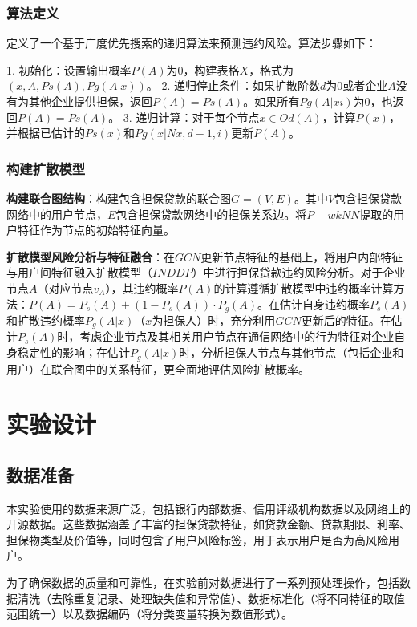 \documentclass{article}
\begin{document}
\subsubsection{算法定义}

定义了一个基于广度优先搜索的递归算法来预测违约风险。算法步骤如下：

1. 初始化：设置输出概率$P(A)$为$0$，构建表格$X$，格式为$(x,A,Ps(A),Pg(A|x))$。
2. 递归停止条件：如果扩散阶数$d$为$0$或者企业$A$没有为其他企业提供担保，返回$P(A)=Ps(A)$。如果所有$Pg(A|xi)$为$0$，也返回$P(A)=Ps(A)$。
3. 递归计算：对于每个节点$x\in Od(A)$，计算$P(x)$，并根据已估计的$Ps(x)$和$Pg(x|Nx,d - 1,i)$更新$P(A)$。
\subsubsection{构建扩散模型\cite{tang2009social}}


\textbf{构建联合图结构}：构建包含担保贷款的联合图$G=(V,E)$。其中$V$包含担保贷款网络中的用户节点，$E$包含担保贷款网络中的担保关系边。将$P - wkNN$提取的用户特征作为节点的初始特征向量。

\textbf{扩散模型风险分析与特征融合}：在$GCN$更新节点特征的基础上，将用户内部特征与用户间特征融入扩散模型（$INDDP$）中进行担保贷款违约风险分析。对于企业节点$A$（对应节点$v_{A}$），其违约概率$P(A)$的计算遵循扩散模型中违约概率计算方法：$P(A)=P_{s}(A)+(1 - P_{s}(A))\cdot P_{g}(A)$。在估计自身违约概率$P_{s}(A)$和扩散违约概率$P_{g}(A|x)$（$x$为担保人）时，充分利用$GCN$更新后的特征。在估计$P_{s}(A)$时，考虑企业节点及其相关用户节点在通信网络中的行为特征对企业自身稳定性的影响；在估计$P_{g}(A|x)$时，分析担保人节点与其他节点（包括企业和用户）在联合图中的关系特征，更全面地评估风险扩散概率。

\section{实验设计}

\subsection{数据准备}

本实验使用的数据来源广泛，包括银行内部数据、信用评级机构数据以及网络上的开源数据。这些数据涵盖了丰富的担保贷款特征，如贷款金额、贷款期限、利率、担保物类型及价值等，同时包含了用户风险标签，用于表示用户是否为高风险用户。

为了确保数据的质量和可靠性，在实验前对数据进行了一系列预处理操作，包括数据清洗（去除重复记录、处理缺失值和异常值）、数据标准化（将不同特征的取值范围统一）以及数据编码（将分类变量转换为数值形式）。
\end{document}
